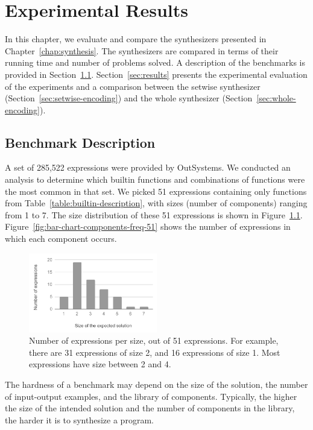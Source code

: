 \chapter{Experimental Results}
\label{chap:experimental-results}

In this chapter, we evaluate and compare the synthesizers presented in
Chapter~\ref{chap:synthesis}.
The synthesizers are compared in terms of their running time and number of
problems solved.
A description of the benchmarks is provided in Section~\ref{sec:bench-desc}.
Section~\ref{sec:results} presents the experimental evaluation of the
experiments and a comparison between the setwise synthesizer
(Section~\ref{sec:setwise-encoding}) and the whole synthesizer
(Section~\ref{sec:whole-encoding}).

\section{Benchmark Description}
\label{sec:bench-desc}

A set of 285,522 expressions were provided by OutSystems.
We conducted an analysis to determine which builtin functions and combinations
of functions were the most common in that set.
We picked 51 expressions containing only functions from
Table~\ref{table:builtin-description}, with sizes (number of components) ranging
from 1 to 7.
The size distribution of these 51 expressions is shown in
Figure~\ref{fig:bar-chart-sizes-51}.
Figure~\ref{fig:bar-chart-components-freq-51} shows the number of expressions in
which each component occurs.

\begin{figure}
  \centering
  \includegraphics[width=0.5\textwidth]{assets/bar-chart-sizes-51.pdf}
  \caption{Number of expressions per size, out of 51 expressions.
    For example, there are 31 expressions of size 2, and 16 expressions of size
    1.
    Most expressions have size between 2 and 4.}
  \label{fig:bar-chart-sizes-51}
\end{figure}

The hardness of a benchmark may depend on the size of the solution, the number
of input-output examples, and the library of components.
Typically, the higher the size of the intended solution and the number of
components in the library, the harder it is to synthesize a program.

